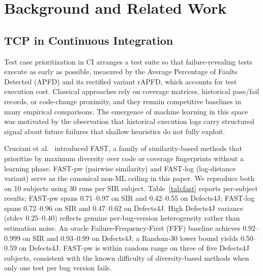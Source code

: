 \documentclass[conference]{IEEEtran}
\begin{document}
\section{Background and Related Work}

\subsection{TCP in Continuous Integration}

Test case prioritization in CI arranges a test suite so that failure-revealing tests execute as early as possible, measured by the Average Percentage of Faults Detected (APFD) and its rectified variant rAPFD, which accounts for test execution cost. Classical approaches rely on coverage matrices, historical pass/fail records, or code-change proximity, and they remain competitive baselines in many empirical comparisons. The emergence of machine learning in this space was motivated by the observation that historical execution logs carry structured signal about future failures that shallow heuristics do not fully exploit.


Cruciani et al.~\cite{cruciani2019} introduced FAST, a family of similarity-based methods that prioritize by maximum diversity over code or coverage fingerprints without a learning phase. FAST-pw (pairwise similarity) and FAST-log (log-distance variant) serve as the canonical non-ML ceiling in this paper. We reproduce both on 10 subjects using 30 runs per SIR subject. Table~\ref{tab:fast} reports per-subject results; FAST-pw spans 0.71--0.97 on SIR and 0.42--0.55 on Defects4J; FAST-log spans 0.72--0.96 on SIR and 0.47--0.62 on Defects4J. High Defects4J variance (stdev 0.25--0.40) reflects genuine per-bug-version heterogeneity rather than estimation noise. An oracle Failure-Frequency-First (FFF) baseline achieves 0.92--0.999 on SIR and 0.93--0.99 on Defects4J; a Random-30 lower bound yields 0.50--0.59 on Defects4J. FAST-pw is within random range on three of five Defects4J subjects, consistent with the known difficulty of diversity-based methods when only one test per bug version fails.
\end{document}
